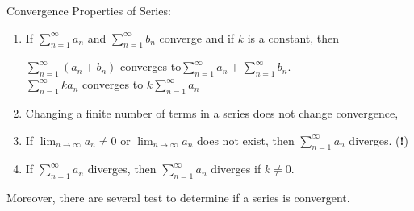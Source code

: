 \documentclass[12pt]{article}
\theoremstyle{definition}
\theoremstyle{definition}
\theoremstyle{remark}
\theoremstyle{definition}
\theoremstyle{definition}
\theoremstyle{definition}
\begin{document}
Convergence Properties of Series:
\begin{enumerate}
\item If $\sum_{n=1}^{\infty} a_n$ and $\sum_{n=1}^{\infty} b_n$ converge and if $k$ is a constant, then

$\sum_{n=1}^{\infty} (a_n+b_n)$ converges to$\sum_{n=1}^{\infty} a_n + \sum_{n=1}^{\infty} b_n$.\\
$\sum_{n=1}^{\infty} ka_n$ converges to $k\sum_{n=1}^{\infty} a_n$

\item Changing a finite number of terms in a series does not change convergence,
\item  If $\lim_{n \to \infty}a_n\neq 0$ or $\lim_{n \to \infty}a_n$ does not exist, then
$\sum_{n=1}^{\infty} a_n$ diverges. (\textbf{!})
\item If $\sum_{n=1}^{\infty} a_n$ diverges, then $\sum_{n=1}^{\infty} a_n$ diverges if $k\neq 0$.
\end{enumerate}
Moreover, there are several test to determine if a series is convergent.
\end{document}
